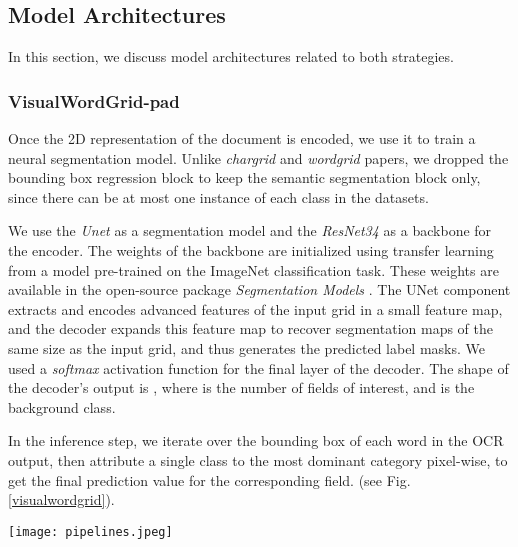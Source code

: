 \documentclass[runningheads]{llncs}
\begin{document}
\subsection{Model Architectures}

In this section, we discuss model architectures related to both strategies.

\subsubsection{VisualWordGrid-pad}\hfill

Once the 2D representation of the document is encoded, we use it to train a neural segmentation model. Unlike \textit{chargrid} and \textit{wordgrid} papers, we dropped the bounding box regression block to keep the semantic segmentation block only, since there can be at most one instance of each class in the datasets. 

We use the \textit{Unet} \cite{unet} as a segmentation model and the \textit{ResNet34} \cite{resnet} as a backbone for the encoder. The weights of the backbone are initialized using transfer learning from a model pre-trained on the ImageNet classification task. These weights are available in the open-source package \textit{Segmentation Models} \cite{sm}. The UNet component extracts and encodes advanced features of the input grid in a small feature map, and the decoder expands this feature map to recover segmentation maps of the same size as the input grid, and thus generates the predicted label masks. We used a \textit{softmax} activation function for the final layer of the decoder. The shape of the decoder's output is , where  is the number of fields of interest, and  is the background class. 

In the inference step, we iterate over the bounding box of each word in the OCR output, then attribute a single class to the most dominant category pixel-wise, to get the final prediction value for the corresponding field. (see Fig.\ref{visualwordgrid}).

\begin{comment}
\begin{figure*}
  \texttt{[image: visualWordgrid.jpeg]}
  \caption{VisualWordGrid-pad pipeline.}
  \label{visualwordgrid}
\end{figure*}
\end{comment}
\begin{figure*}
  \texttt{[image: pipelines.jpeg]}
  \caption{VisualWordGrid pipelines.}
  \label{visualwordgrid}
\end{figure*}
\end{document}
